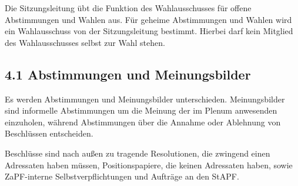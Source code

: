 \documentclass[12pt,oneside]{scrartcl}
\begin{document}
Die Sitzungsleitung übt die Funktion des Wahlausschusses für offene Abstimmungen und
Wahlen aus. Für geheime Abstimmungen und Wahlen wird ein Wahlausschuss von der
Sitzungsleitung bestimmt. Hierbei darf kein Mitglied des Wahlausschusses selbst zur
Wahl stehen.


\subsection{4.1 Abstimmungen und Meinungsbilder%
  \label{abstimmungen-und-meinungsbilder}%
}
\setcounter{listcnt0}{0}
\begin{list}{.}
{
\setlength{\rightmargin}{\leftmargin}
}

\item Es werden Abstimmungen und Meinungsbilder unterschieden. Meinungsbilder
sind informelle Abstimmungen um die Meinung der im Plenum anwesenden
einzuholen, während Abstimmungen über die Annahme oder Ablehnung von
Beschlüssen entscheiden.

\item Beschlüsse sind nach außen zu tragende Resolutionen, die zwingend einen
Adressaten haben müssen, Positionspapiere, die keinen Adressaten haben,
sowie ZaPF-interne Selbstverpflichtungen und Aufträge an den StAPF.
\end{list}
\setcounter{listcnt0}{0}
\end{document}
